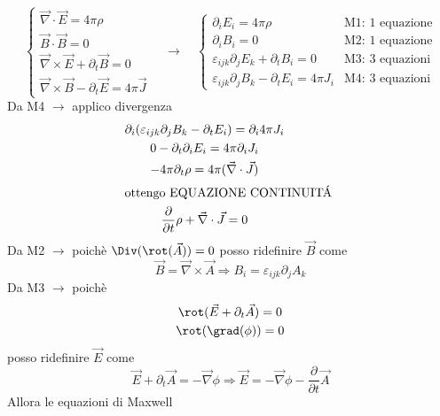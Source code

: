 \begin{equation*}
    \begin{cases}
        \vec{\nabla} \cdot \vec{E} = 4\pi\rho \\
        \vec{B} \cdot \vec{B} = 0 \\
        \vec{\nabla} \times \vec{E} + \partial_t \vec{B} = 0 \\
        \vec{\nabla} \times \vec{B} - \partial_t \vec{E} = 4 \pi \vec{J}
    \end{cases} \quad \rightarrow \quad 
    \begin{cases}
        \partial_i E_i = 4\pi \rho  & \text{M1: 1 equazione}\\
        \partial_i B_i = 0  & \text{M2: 1 equazione}\\
        \varepsilon_{ijk} \partial_j E_k + \partial_t B_i = 0 & \text{M3: 3 equazioni}\\
        \varepsilon_{ijk} \partial_j B_k - \partial_t E_i = 4 \pi J_i & \text{M4: 3 equazioni}
    \end{cases}
\end{equation*}
Da M4 $\rightarrow$ applico divergenza
\begin{gather*}
    \partial_i (\varepsilon_{ijk} \partial_j B_k - \partial_t E_i) = \partial_i 4 \pi J_i \\
    0 - \partial_t \partial_i E_i = 4\pi\partial_i J_i \\
    - 4\pi \partial_t \rho = 4\pi (\vec{\nabla}\cdot \vec{J}) \\
    \intertext{ottengo EQUAZIONE CONTINUIT\'A } 
    \frac{\partial}{\partial t}\rho + \vec{\nabla} \cdot \vec{J} = 0
\end{gather*}
\noindent Da M2 $\rightarrow$ poichè $\Div(\rot(\vec{A})) = 0$ posso ridefinire $\vec{B}$ come
\begin{equation*}
    \vec{B} = \vec{\nabla} \times \vec{A} \Rightarrow B_i = \varepsilon_{ijk} \partial_j A_k
\end{equation*}
Da M3 $\rightarrow$ poichè
\begin{gather*}
    \rot(\vec{E} + \partial_t \vec{A}) = 0 \\
    \rot(\grad(\phi)) = 0
\end{gather*}
posso ridefinire $\vec{E}$ come
\begin{equation*}
    \vec{E} + \partial_t \vec{A} = -\vec{\nabla}\phi \Rightarrow \vec{E} = - \vec{\nabla} \phi - \frac{\partial}{\partial t} \vec{A}
\end{equation*}
Allora le equazioni di Maxwell
